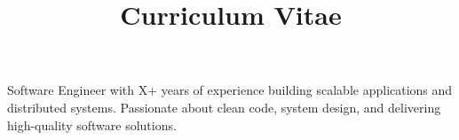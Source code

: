 \documentclass[a4paper,skipsamekey,11pt,english]{curve}
\title{Curriculum Vitae}
\begin{document}
\makeheaders[c]

{\small Software Engineer with X+ years of experience building scalable applications and distributed systems. Passionate about clean code, system design, and delivering high-quality software solutions.}

\par\noindent




\end{document}

